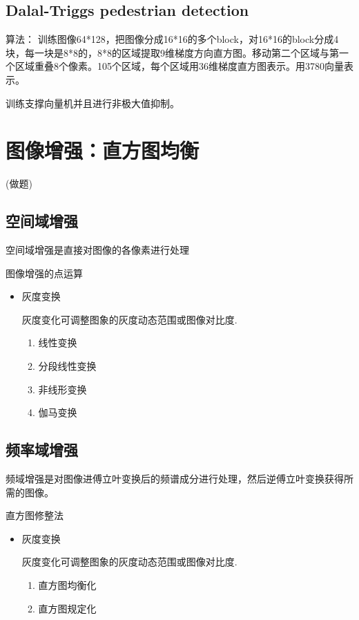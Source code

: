 \documentclass[UTF8]{ctexart}
\begin{document}
\subsection{Dalal-Triggs pedestrian detection}

算法：
训练图像64*128，把图像分成16*16的多个block，对16*16的block分成4块，每一块是8*8的，8*8的区域提取9维梯度方向直方图。移动第二个区域与第一个区域重叠8个像素。105个区域，每个区域用36维梯度直方图表示。用3780向量表示。

训练支撑向量机并且进行非极大值抑制。

\section{图像增强：直方图均衡}(做题)

\subsection{空间域增强}

空间域增强是直接对图像的各像素进行处理

图像增强的点运算

\begin{itemize}
    \item 灰度变换
    
    灰度变化可调整图象的灰度动态范围或图像对比度.
    \begin{enumerate}
        \item 线性变换
        \item 分段线性变换
        \item 非线形变换
        \item 伽马变换
    \end{enumerate}
\end{itemize}

\subsection{频率域增强}

频域增强是对图像进傅立叶变换后的频谱成分进行处理，然后逆傅立叶变换获得所需的图像。


直方图修整法

\begin{itemize}
    \item 灰度变换
    
    灰度变化可调整图象的灰度动态范围或图像对比度.
    \begin{enumerate}
        \item 直方图均衡化
        \item 直方图规定化
    \end{enumerate}
\end{itemize}
\end{document}

